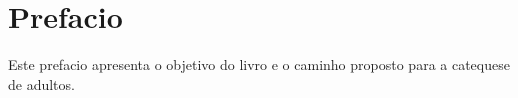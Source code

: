 \chapter*{Prefacio}

Este prefacio apresenta o objetivo do livro e o caminho proposto para a catequese de adultos.
